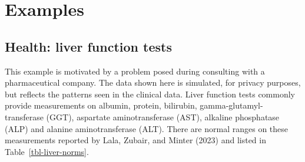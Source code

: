 \documentclass[
  12pt,
]{interact}
\begin{document}
\section{Examples}\label{sec-examples}

\subsection{Health: liver function
tests}\label{health-liver-function-tests}

This example is motivated by a problem posed during consulting with a
pharmaceutical company. The data shown here is simulated, for privacy
purposes, but reflects the patterns seen in the clinical data. Liver
function tests commonly provide measurements on albumin, protein,
bilirubin, gamma-glutamyl- transferase (GGT), aspartate aminotransferase
(AST), alkaline phosphatase (ALP) and alanine aminotransferase (ALT).
There are normal ranges on these measurements reported by Lala, Zubair,
and Minter (2023) and listed in Table~\ref{tbl-liver-norms}.
\end{document}
